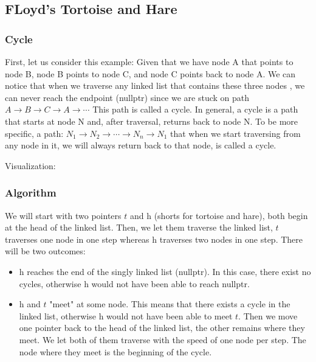 \documentclass[12pt, letterpaper]{article}
\newcommand{\tortoise}{\textit{t}}
\newcommand{\hare}{\textit{h}}
\begin{document}
\subsection{FLoyd's Tortoise and Hare}
\subsubsection{Cycle}
First, let us consider this example: Given that we have node A that points to node B, node B points to node C, and node C points back to node A. We can notice that when we traverse any linked list that contains these three nodes , we can never reach the endpoint (nullptr) since we are stuck on path \( A \rightarrow B \rightarrow C \rightarrow A\rightarrow \cdots \) This path is called a cycle.
In general, a cycle is a path that starts at node N and, after traversal, returns back to node N. To be more specific, a path: \( N_1 \rightarrow N_2 \rightarrow \cdots \rightarrow N_n \rightarrow N_1 \) that when we start traversing from any node in it, we will always return back to that node, is called a cycle.

Visualization:
\begin{center}
\end{center}
\subsubsection{Algorithm}
We will start with two pointers \(\tortoise\) and \(\hare\) (shorts for tortoise and hare), both begin at the head of the linked list. Then, we let them traverse the linked list, \(\tortoise\) traverses one node in one step whereas \(\hare\) traverses two nodes in one step. There will be two outcomes:
\begin{itemize}
\item \(\hare\) reaches the end of the singly linked list (nullptr). In this case, there exist no cycles, otherwise \(\hare\) would not have been able to reach nullptr.
\item \(\hare\) and \(\tortoise\) "meet" at some node. This means that there exists a cycle in the linked list, otherwise \(\hare\) would not have been able to meet \(\tortoise\). Then we move one pointer back to the head of the linked list, the other remains where they meet. We let both of them traverse with the speed of one node per step. The node where they meet is the beginning of the cycle.
\end{itemize}
\end{document}
